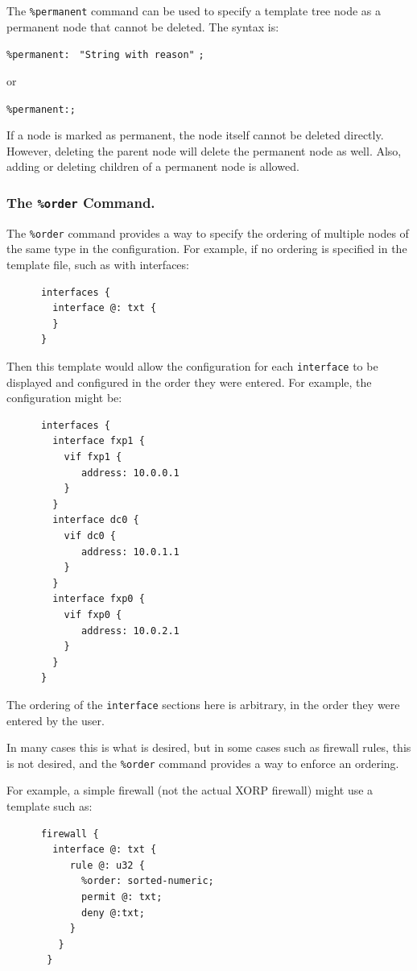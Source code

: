 \documentclass[11pt]{article}
\begin{document}
The {\tt \%permanent} command can be used to specify a template tree
node as a permanent node that cannot be deleted.
The syntax is:

\texttt{\%permanent: } \texttt{"String with reason"} \texttt{;}

or

\texttt{\%permanent:;}

If a node is marked as permanent, the node itself cannot be deleted
directly. However, deleting the parent node will delete the permanent
node as well. Also, adding or deleting children of a permanent node
is allowed.

\subsubsection{The {\tt \%order} Command.}

The {\tt \%order} command provides a way to specify the ordering of
multiple nodes of the same type in the configuration.  For example, if
no ordering is specified in the template file, such as with interfaces:

\begin{verbatim}
      interfaces {
        interface @: txt {
        }
      }
\end{verbatim}

\noindent Then this template would allow the configuration for each
{\tt interface} to be displayed and configured in the order they were
entered.  For example, the configuration might be:

\begin{verbatim}
      interfaces {
        interface fxp1 {
          vif fxp1 {
             address: 10.0.0.1
          }
        }
        interface dc0 {
          vif dc0 {
             address: 10.0.1.1
          }
        }
        interface fxp0 {
          vif fxp0 {
             address: 10.0.2.1
          }
        }
      }
\end{verbatim}

\noindent The ordering of the {\tt interface} sections here is
arbitrary, in the order they were entered by the user.

\noindent In many cases this is what is desired, but in some cases such as
firewall rules, this is not desired, and the {\tt \%order} command
provides a way to enforce an ordering.

\noindent For example, a simple firewall (not the actual XORP firewall) might
use a template such as:
\begin{verbatim}
      firewall {
        interface @: txt {
           rule @: u32 {
             %order: sorted-numeric;
             permit @: txt;
             deny @:txt;
           }
         }
       }
\end{verbatim}
\end{document}

